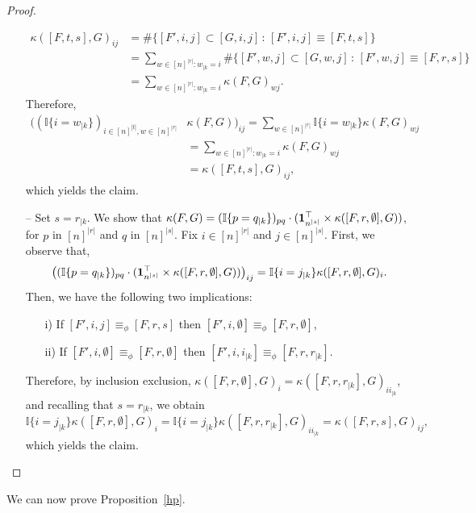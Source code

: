 \documentclass{article}
\theoremstyle{plain}
\begin{document}
\begin{proof}
\begin{itemize}[leftmargin= *]
\begin{align*}
\kappa([F,t,s],G)_{ij}
&= \#\big\{[F',i,j]\subset [G,i,j]\,:\,[F',i,j]\equiv [F,t,s]\big\}\\
&=\sum_{w\in[n]^{|r|}: w_{|k}=i}
\#\big\{[F',w,j]\subset [G,w,j]\,:\,[F',w,j]\equiv [F,r,s]\big\}\\
&=\sum_{w\in[n]^{|r|}: w_{|k}=i}\kappa(F,G)_{wj}.
\end{align*}
Therefore,
\begin{align*}
\big((\mathbb{I}\{i=w_{|k}\})_{i\in[n]^{|t|},w\in[n]^{|r|}}&\kappa(F,G)\big)_{ij}
=\sum_{w\in[n]^{|r|}}\mathbb{I}\{i=w_{|k}\}\kappa(F,G)_{wj}\\
&=\sum_{w\in[n]^{|r|}: w_{|k}=i}\kappa(F,G)_{wj}\\
&=\kappa([F,t,s],G)_{ij},
\end{align*}
which yields the claim.
\item[--] Set $s=r_{|k}$. We show that $\kappa(F,G)=(\mathbb{I}\{p=q_{|k}\})_{pq}\cdot({\bf 1}_{n^{|s|}}^\top\times\kappa([F,r,\emptyset],G))$, for $p$ in $[n]^{|r|}$ and $q$ in $[n]^{|s|}$. Fix $i\in[n]^{|r|}$ and $j\in[n]^{|s|}$. First, we observe that,
\[
\big((\mathbb{I}\{p=q_{|k}\})_{pq}\cdot({\bf 1}_{n^{|s|}}^\top\times\kappa([F,r,\emptyset],G))\big)_{ij} = 
\mathbb{I}\{i=j_{|k}\}\kappa([F,r,\emptyset],G)_{i}.
\]
Then, we have the following two implications:
\vspace{-.3333\baselineskip}
\begin{itemize}
\item[i)] If $[F',i,j]\equiv_\phi [F,r,s]$ then $[F',i,\emptyset]\equiv_\phi [F,r,\emptyset]$,
\item[ii)] If $[F',i,\emptyset]\equiv_\phi [F,r,\emptyset]$ then $[F',i,i_{|k}]\equiv_\phi [F,r,r_{|k}]$.
\end{itemize}
\vspace{-.3333\baselineskip}
Therefore, by inclusion exclusion, $\kappa([F,r,\emptyset],G)_{i}=\kappa([F,r,r_{|k}],G)_{ii_{|k}}$, and recalling that $s=r_{|k}$, we obtain
\[
\mathbb{I}\{i=j_{|k}\}\kappa([F,r,\emptyset],G)_{i}
 = \mathbb{I}\{i=j_{|k}\}\kappa([F,r,r_{|k}],G)_{ii_{|k}}
 = \kappa([F,r,s],G)_{ij},
\]
which yields the claim.\qedhere
\end{itemize}
\end{proof}
We can now prove Proposition~\ref{hp}.
\end{document}
